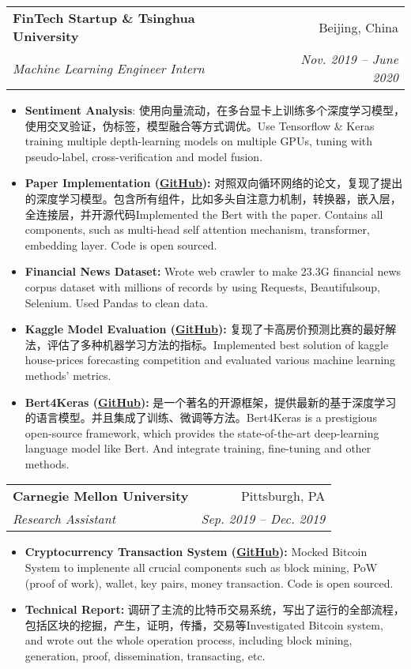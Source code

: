 \documentclass[letterpaper,11pt]{article}
\makeatletter
\newcommand{\resumeItem}[1]{
    \item\small{
            {#1 \vspace{-2pt}}
    }
}
\newcommand{\resumeSubheading}[4]{
    \vspace{-2pt}\item
    \begin{tabular*}{\textwidth}[t]{l@{\extracolsep{\fill}}r}
        \normalsize\textbf{#1} & #2 \\
        \textit{\small#3} & \textit{\small #4} \\
    \end{tabular*}\vspace{-7pt}
}
\newcommand{\resumeSubSubheading}[2]{
    \item
    \begin{tabular*}{\textwidth}{l@{\extracolsep{\fill}}r}
        \textit{\small#1} & \textit{\small #2} \\
    \end{tabular*}\vspace{-7pt}
}
\newcommand{\resumeSubHeadingListEnd}{\end{itemize}}
\newcommand{\resumeItemListStart}{\begin{itemize}[leftmargin=.4in, labelsep=.13in]}
\newcommand{\resumeItemListEnd}{\end{itemize}\vspace{-5pt}}
\makeatother
\begin{document}

\resumeSubheading
{FinTech Startup \& Tsinghua University}{Beijing, China}
{Machine Learning Engineer Intern}{Nov. 2019 -- June 2020}
\resumeItemListStart
\resumeItem{\textbf{Sentiment Analysis}: 使用向量流动，在多台显卡上训练多个深度学习模型，使用交叉验证，伪标签，模型融合等方式调优。Use Tensorflow \& Keras training multiple depth-learning models on multiple GPUs, tuning with pseudo-label, cross-verification and model fusion.}
\resumeItem{\textbf{Paper Implementation (\href{https://github.com/yiyangiliu/BERT_Paper_Implementation}{\underline{GitHub}}):} 对照双向循环网络的论文，复现了提出的深度学习模型。包含所有组件，比如多头自注意力机制，转换器，嵌入层，全连接层，并开源代码Implemented the Bert with the paper. Contains all components, such as multi-head self attention mechanism, transformer, embedding layer. Code is open sourced.}
\resumeItem{\textbf{Financial News Dataset:} Wrote web crawler to make 23.3G financial news corpus dataset with millions of records by using Requests, Beautifulsoup, Selenium. Used Pandas to clean data.}
\resumeItem{\textbf{Kaggle Model Evaluation (\href{https://github.com/yiyangiliu/blog/blob/master/contents/kaggle-house-price-forecasting-competition-advanced.md}{\underline{GitHub}}):} 复现了卡高房价预测比赛的最好解法，评估了多种机器学习方法的指标。Implemented best solution of kaggle house-prices forecasting competition and evaluated various machine learning methods' metrics.}
\resumeItem{\textbf{Bert4Keras (\href{https://github.com/bojone/bert4keras}{\underline{GitHub}}):} 是一个著名的开源框架，提供最新的基于深度学习的语言模型。并且集成了训练、微调等方法。Bert4Keras is a prestigious open-source framework, which provides the state-of-the-art deep-learning language model like Bert. And integrate training, fine-tuning and other methods.}
\resumeItemListEnd

\resumeSubheading
{Carnegie Mellon University}{Pittsburgh, PA}
{Research Assistant}{Sep. 2019 -- Dec. 2019}
\resumeItemListStart
\resumeItem{\textbf{Cryptocurrency Transaction System (\href{https://github.com/yiyangiliu/A-simplified-Bitcoin-Transaction-System}{\underline{GitHub}}):} Mocked Bitcoin System to implenente all crucial components such as block mining, PoW (proof of work), wallet, key pairs, money transaction. Code is open sourced.}
\resumeItem{\textbf{Technical Report:} 调研了主流的比特币交易系统，写出了运行的全部流程，包括区块的挖掘，产生，证明，传播，交易等Investigated Bitcoin system, and wrote out the whole operation process, including block mining, generation, proof, dissemination, transacting, etc.}
\resumeItemListEnd
\end{document}
